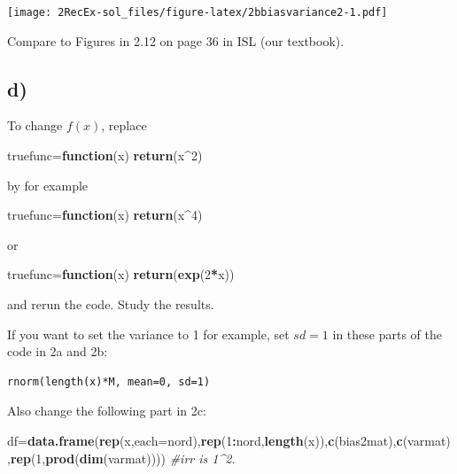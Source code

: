 \documentclass[]{article}
\newenvironment{Shaded}{\begin{snugshade}}{\end{snugshade}}
\newcommand{\KeywordTok}[1]{\textcolor[rgb]{0.13,0.29,0.53}{\textbf{#1}}}
\newcommand{\DataTypeTok}[1]{\textcolor[rgb]{0.13,0.29,0.53}{#1}}
\newcommand{\DecValTok}[1]{\textcolor[rgb]{0.00,0.00,0.81}{#1}}
\newcommand{\CommentTok}[1]{\textcolor[rgb]{0.56,0.35,0.01}{\textit{#1}}}
\newcommand{\ControlFlowTok}[1]{\textcolor[rgb]{0.13,0.29,0.53}{\textbf{#1}}}
\newcommand{\OperatorTok}[1]{\textcolor[rgb]{0.81,0.36,0.00}{\textbf{#1}}}
\newcommand{\NormalTok}[1]{#1}
\begin{document}
\texttt{[image: 2RecEx-sol\_files/figure-latex/2bbiasvariance2-1.pdf]}

Compare to Figures in 2.12 on page 36 in ISL (our textbook).

\subsection{d)}\label{d}

To change \(f(x)\), replace

\begin{Shaded}
\begin{Highlighting}[]
\NormalTok{truefunc=}\ControlFlowTok{function}\NormalTok{(x) }\KeywordTok{return}\NormalTok{(x}\OperatorTok{^}\DecValTok{2}\NormalTok{)}
\end{Highlighting}
\end{Shaded}

by for example

\begin{Shaded}
\begin{Highlighting}[]
\NormalTok{truefunc=}\ControlFlowTok{function}\NormalTok{(x) }\KeywordTok{return}\NormalTok{(x}\OperatorTok{^}\DecValTok{4}\NormalTok{)}
\end{Highlighting}
\end{Shaded}

or

\begin{Shaded}
\begin{Highlighting}[]
\NormalTok{truefunc=}\ControlFlowTok{function}\NormalTok{(x) }\KeywordTok{return}\NormalTok{(}\KeywordTok{exp}\NormalTok{(}\DecValTok{2}\OperatorTok{*}\NormalTok{x))}
\end{Highlighting}
\end{Shaded}

and rerun the code. Study the results.

If you want to set the variance to 1 for example, set \(sd=1\) in these
parts of the code in 2a and 2b:

\begin{verbatim}
rnorm(length(x)*M, mean=0, sd=1)
\end{verbatim}

Also change the following part in 2c:

\begin{Shaded}
\begin{Highlighting}[]
\NormalTok{df=}\KeywordTok{data.frame}\NormalTok{(}\KeywordTok{rep}\NormalTok{(x,}\DataTypeTok{each=}\NormalTok{nord),}\KeywordTok{rep}\NormalTok{(}\DecValTok{1}\OperatorTok{:}\NormalTok{nord,}\KeywordTok{length}\NormalTok{(x)),}\KeywordTok{c}\NormalTok{(bias2mat),}\KeywordTok{c}\NormalTok{(varmat),}\KeywordTok{rep}\NormalTok{(}\DecValTok{1}\NormalTok{,}\KeywordTok{prod}\NormalTok{(}\KeywordTok{dim}\NormalTok{(varmat)))) }\CommentTok{#irr is 1^2.}
\end{Highlighting}
\end{Shaded}
\end{document}
